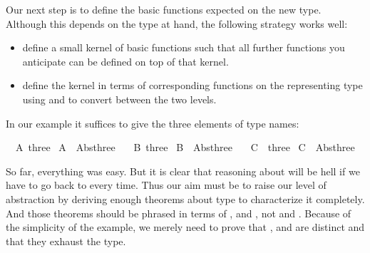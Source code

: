 \begin{isabellebody}
\begin{isamarkuptext}
Our next step is to define the basic functions expected on the new type.
Although this depends on the type at hand, the following strategy works well:
\begin{itemize}
\item define a small kernel of basic functions such that all further
functions you anticipate can be defined on top of that kernel.
\item define the kernel in terms of corresponding functions on the
representing type using  and  to convert between the
two levels.
\end{itemize}
In our example it suffices to give the three elements of type 
names:%
\end{isamarkuptext}%
\isanewline
\ \ A{\isacharcolon}{\isacharcolon}\ three\isanewline
\ {\isachardoublequote}A\ {\isasymequiv}\ Abs{\isacharunderscore}three\ {}{\isachardoublequote}\isanewline
\ \ B{\isacharcolon}{\isacharcolon}\ three\isanewline
\ {\isachardoublequote}B\ {\isasymequiv}\ Abs{\isacharunderscore}three\ {}{\isachardoublequote}\isanewline
\ \ C\ {\isacharcolon}{\isacharcolon}\ three\isanewline
\ {\isachardoublequote}C\ {\isasymequiv}\ Abs{\isacharunderscore}three\ {}{\isachardoublequote}%
\begin{isamarkuptext}%
So far, everything was easy. But it is clear that reasoning about  will be hell if we have to go back to  every time. Thus our
aim must be to raise our level of abstraction by deriving enough theorems
about type  to characterize it completely. And those theorems
should be phrased in terms of ,  and , not  and . Because of the simplicity of the example,
we merely need to prove that ,  and  are distinct
and that they exhaust the type.


\end{isamarkuptext}
\end{isabellebody}
